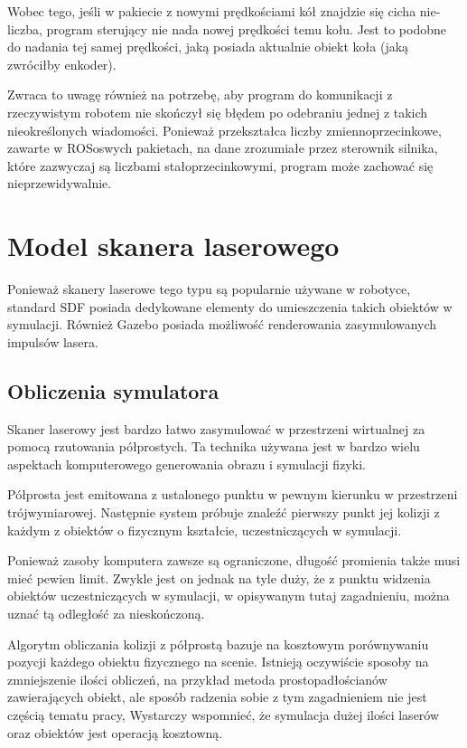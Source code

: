 		Wobec tego, jeśli w pakiecie z nowymi prędkościami kół znajdzie się cicha nie-liczba, program sterujący nie nada nowej prędkości temu kołu.
		Jest to podobne do nadania tej samej prędkości, jaką posiada aktualnie obiekt koła (jaką zwróciłby enkoder).

		Zwraca to uwagę również na potrzebę, aby program do komunikacji z rzeczywistym robotem nie skończył się błędem po odebraniu jednej z takich nieokreślonych wiadomości.
		Ponieważ przekształca liczby zmiennoprzecinkowe, zawarte w ROSoswych pakietach, na dane zrozumiałe przez sterownik silnika, które zazwyczaj są liczbami
		stałoprzecinkowymi, program może zachować się nieprzewidywalnie.
		
\section{Model skanera laserowego}
	Ponieważ skanery laserowe tego typu są popularnie używane w robotyce, standard SDF posiada dedykowane elementy do umieszczenia takich obiektów w symulacji.
	Również Gazebo posiada możliwość renderowania zasymulowanych impulsów lasera.
	
	\subsection{Obliczenia symulatora}
		Skaner laserowy jest bardzo łatwo zasymulować w przestrzeni wirtualnej za pomocą rzutowania półprostych.
		Ta technika używana jest w bardzo wielu aspektach komputerowego generowania obrazu i symulacji fizyki.

		Półprosta jest emitowana z ustalonego punktu w pewnym kierunku w przestrzeni trójwymiarowej.
		Następnie system próbuje znaleźć pierwszy punkt jej kolizji z każdym z obiektów o fizycznym kształcie, uczestniczących w symulacji.
		
		Ponieważ zasoby komputera zawsze są ograniczone, długość promienia także musi mieć pewien limit. 
		Zwykle jest on jednak na tyle duży, że z punktu widzenia obiektów uczestniczących w symulacji, w opisywanym tutaj zagadnieniu, 
		można uznać tą odległość za nieskończoną.

		Algorytm obliczania kolizji z półprostą bazuje na kosztowym porównywaniu pozycji każdego obiektu fizycznego na scenie.
		Istnieją oczywiście sposoby na zmniejszenie ilości obliczeń, na przykład metoda prostopadłościanów zawierających obiekt, ale sposób radzenia sobie z tym zagadnieniem nie jest
		częścią tematu pracy,
		Wystarczy wspomnieć, że symulacja dużej ilości laserów oraz obiektów jest operacją kosztowną.
		
